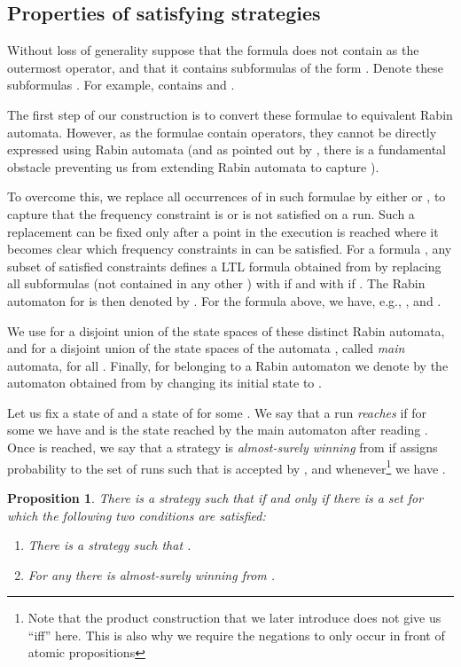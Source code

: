 \documentclass[a4paper,UKenglish]{lipics}
\newtheorem{proposition}[theorem]{\bfseries  Proposition}
\begin{document}
\subsection{Properties of satisfying strategies}
\label{sec:strat}

Without loss of generality suppose that the formula  does not contain  as the outermost operator, and that it contains  subformulas of the form . Denote these subformulas . 
For example, 
contains  and .

The first step of our construction is to convert these formulae  to equivalent Rabin automata. However, as the formulae contain  operators, they cannot be directly expressed using Rabin automata (and as pointed out by \cite{AT12}, there is a fundamental obstacle preventing us from extending Rabin automata to capture ). 

To overcome this, we replace all occurrences of  in such formulae by either  or , to capture that the frequency constraint is or is not satisfied on a run. 
Such a replacement can be fixed only after a point in the execution is reached where it becomes clear which frequency constraints in  can be satisfied.
For a formula , any subset  of satisfied constraints defines a LTL formula  obtained from 
 by replacing all subformulas  (not contained in any other ) with  if  and with  if . The Rabin automaton for  is then denoted by .
For the formula  above, we have, e.g.,
, and . 

We use  for a disjoint union of the state spaces of these distinct Rabin automata, and  for a disjoint union of the state spaces of the automata , called \emph{main} automata, for all . 
Finally, for  belonging to a Rabin automaton  we denote by  the automaton obtained from  by changing its initial state to .

Let us fix a state  of  and a state  of  for some . We say that a run  \emph{reaches}  if for some  we have  and  is the state reached by the main automaton  after reading . Once  is reached, we say that a strategy  is \emph{almost-surely winning} from  if  assigns probability  to the set of runs  such that  is accepted by , and  whenever\footnote{Note that the product construction that we later introduce does not give us ``iff'' here. This is also why we require the negations to only occur in front of atomic propositions} we have .

\begin{proposition}\label{prop:reach}
	There is a strategy  such that 
	if and only if
	there is a set  for which the following two conditions are satisfied:
	\begin{enumerate}
		\item\label{item:2a} There is a strategy  such that \omega\Upsilon.
		\item\label{item:2b} For any  there is  almost-surely winning from .
	\end{enumerate}
\end{proposition}
\end{document}
